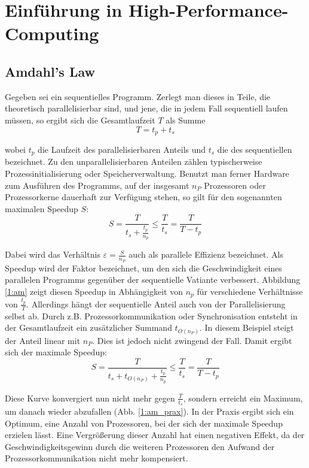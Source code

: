 	\chapter{Einf\"uhrung in High-Performance-Computing} 
		\section{Amdahl's Law}
		Gegeben sei ein sequentielles Programm. Zerlegt man dieses in Teile, die theoretisch parallelisierbar sind, und jene, die in jedem Fall sequentiell laufen müssen, so ergibt sich die Gesamtlaufzeit $T$ als Summe 
		\begin{equation}\label{eq1:am}
		    T = t_p + t_s
        \end{equation}
        
        wobei $t_p$ die Laufzeit des parallelisierbaren Anteils und $t_s$ die des sequentiellen bezeichnet. Zu den unparallelisierbaren Anteilen zählen typischerweise Prozessinitialisierung oder Speicherverwaltung. Benutzt man ferner Hardware zum Ausführen des Programms, auf der insgesamt $n_P$ Prozessoren oder Prozessorkerne dauerhaft zur Verfügung stehen, so gilt für den sogenannten maximalen Speedup $S$:
		\begin{equation}
		    S = \frac{T}{t_s + \frac{t_p}{n_p}} \leq \frac{T}{t_s} = \frac{T}{T-t_p}
        \end{equation}	   
		
		Dabei wird das Verhältnis $\varepsilon = \frac{S}{n_P}$ auch als \gls{parallele Effizienz} bezeichnet. Als \Gls{Speedup} wird der Faktor bezeichnet, um den sich die Geschwindigkeit eines parallelen Programms gegenüber der sequentielle Vatiante verbessert. Abbildung \ref{1:am} zeigt diesen Speedup in Abhängigkeit von $n_p$ für verschiedene Verhältnisse von $\frac{t_p}{T}$.
		Allerdings hängt der sequentielle Anteil auch von der Parallelisierung selbst ab. Durch z.B. Prozessorkommunikation oder Synchronisation entsteht in der Gesamtlaufzeit ein zusätzlicher Summand	$t_{O(n_P)}$. In diesem Beispiel steigt der Anteil linear mit $n_P$. Dies ist jedoch nicht zwingend der Fall. Damit ergibt sich der maximale \Gls{Speedup}:		
		\begin{equation}
		    S = \frac{T}{t_s + t_{O(n_P)} + \frac{t_p}{n_p}} \leq \frac{T}{t_s} = \frac{T}{T-t_p}		
		\end{equation}
		
		Diese Kurve konvergiert nun nicht mehr gegen $\frac{T}{t_s}$, sondern erreicht ein Maximum, um danach wieder abzufallen (Abb. \ref{1:am_prax}). In der Praxis ergibt sich ein Optimum, eine Anzahl von Prozessoren, bei der sich der maximale \Gls{Speedup} erzielen lässt. Eine Vergrößerung dieser Anzahl hat einen negativen Effekt, da der Geschwindigkeitsgewinn durch die weiteren Prozessoren den Aufwand der Prozessorkommunikation nicht mehr kompensiert.


